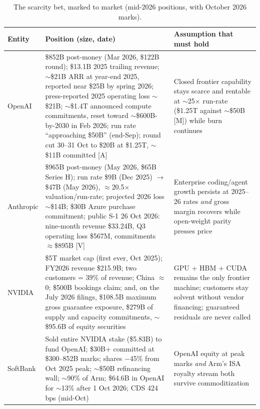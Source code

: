 \begin{table}[htbp]
  \centering
  \scriptsize
  \caption{The scarcity bet, marked to market (mid-2026 positions, with October 2026 marks).}
  \label{tab:exposure}
  \begin{tabular}{p{24mm}p{56mm}p{56mm}}
    \toprule
    Entity & Position (size, date) & Assumption that must hold \\
    \midrule
    OpenAI & \$852B post-money (Mar 2026, \$122B round); \$13.1B 2025 trailing revenue; $\sim$\$21B ARR at year-end 2025, reported near \$25B by spring 2026; press-reported 2025 operating loss $\sim$\$21B; $\sim$\$1.4T announced compute commitments, reset toward $\sim$\$600B-by-2030 in Feb 2026; run rate ``approaching \$50B'' (end-Sep); round cut 30--31 Oct to \$20B at \$1.25T, $\sim$\$11B committed [A]~\cite{openai-valuation,openai-rev,openai-losses,openai-commit,cap-openai-revenue-ft,cap-openai-round} & Closed frontier capability stays scarce and rentable at $\sim$25$\times$ run-rate (\$1.25T against $\sim$\$50B [M]) while burn continues \\
    \addlinespace
    Anthropic & \$965B post-money (May 2026, \$65B Series H); run rate \$9B (Dec 2025) $\to$ \$47B (May 2026), $\approx$20.5$\times$ valuation/run-rate; projected 2026 loss $\sim$\$14B; \$30B Azure purchase commitment; public S-1 26 Oct 2026: nine-month revenue \$33.24B, Q3 operating loss \$567M, commitments $\approx$\$895B [V]~\cite{anthropic-series-h,openai-s1,cap-anthropic-s1} & Enterprise coding/agent growth persists at 2025--26 rates \emph{and} gross margin recovers while open-weight parity presses price \\
    \addlinespace
    NVIDIA & \$5T market cap (first ever, Oct 2025); FY2026 revenue \$215.9B; two customers = 39\% of revenue; China $\approx$ 0; \$500B bookings claim; and, on the July 2026 filings, \$108.5B maximum gross guarantee exposure, \$279B of supply and capacity commitments, $\sim$\$95.6B of equity securities~\cite{nvidia-5t,nvidia-fy2026,nvidia-concentration,nvda-exposure} & GPU + HBM + CUDA remains the only frontier machine; customers stay solvent without vendor financing; guaranteed residuals are never called \\
    \addlinespace
    SoftBank & Sold entire NVIDIA stake (\$5.83B) to fund OpenAI; \$30B+ committed at \$300--852B marks; shares $-$45\% from Oct 2025 peak; $\sim$\$50B refinancing wall; $\sim$90\% of Arm; \$64.6B in OpenAI for $\sim$13\% after 1 Oct 2026; CDS 424\,bps (mid-Oct)~\cite{softbank-nvidia-sale,softbank-openai,cap-softbank-complete,cap-oracle-cds-oct} & OpenAI equity at peak marks \emph{and} Arm's ISA royalty stream both survive commoditization \\

\end{tabular}
\end{table}
